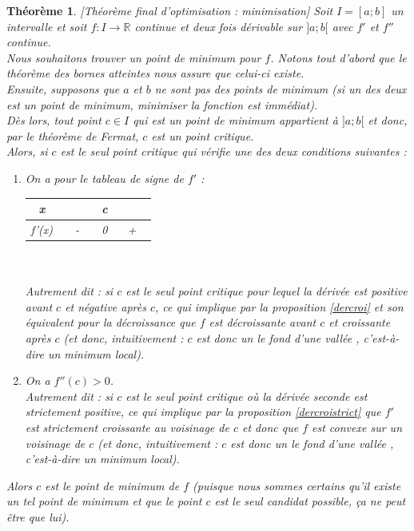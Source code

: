 \documentclass[a4paper,fontsize=13pt]{scrreprt}
\theoremstyle{plain}
\newtheorem{thé}[subsection]{Théorème}
\theoremstyle{definition}
\newcommand{\rr}{\mathbb{R}}
\begin{document}
\begin{thé} \label{tfomin} [Théorème final d'optimisation : minimisation]
Soit $I=[a;b]$ un intervalle et soit $f : I \to \rr$ continue et deux fois dérivable sur $]a;b[$ avec $f'$ et $f''$ continue.\\
Nous souhaitons trouver un point de minimum pour $f$. Notons tout d'abord que le théorème des bornes atteintes nous assure que celui-ci existe. \\
Ensuite, supposons que $a$ et $b$ ne sont pas des points de minimum (si un des deux est un point de minimum, minimiser la fonction est immédiat). \\
Dès lors, tout point $c \in I$ qui est un point de minimum appartient à $]a;b[$ et donc, par le théorème de Fermat, $c$ est un point critique. \\
Alors, si $c$ est le seul point critique qui vérifie une des deux conditions suivantes :
\begin{enumerate}
\item On a pour le tableau de signe de $f'$ :
\begin{tabular}{|c|c c c|}
  \hline
  x & ~~~~ & c & ~~~~ \\
  \hline
  f'(x) & - & 0 & + \\
  \hline
\end{tabular}
~~\\
~~\\
Autrement dit : si $c$ est le seul point critique pour lequel la dérivée est positive avant $c$ et négative après $c$, ce qui implique par la proposition \ref{dercroi} et son équivalent pour la décroissance que $f$ est décroissante avant $c$ et croissante après $c$ (et donc, intuitivement : $c$ est donc un \og le fond d'une vallée \fg{}, c'est-à-dire un minimum local).
\item On a $f''(c) > 0$. \\
Autrement dit : si $c$ est le seul point critique où la dérivée seconde est strictement positive, ce qui implique par la proposition \ref{dercroistrict} que $f'$ est strictement croissante au voisinage de $c$ et donc que $f$ est convexe sur un voisinage de $c$ (et donc, intuitivement : $c$ est donc un \og le fond d'une vallée \fg{}, c'est-à-dire un minimum local).
\end{enumerate}
Alors $c$ est le point de minimum de $f$ (puisque nous sommes certains qu'il existe un tel point de minimum et que le point $c$ est le seul candidat possible, ça ne peut être que lui).
\end{thé}
\end{document}
